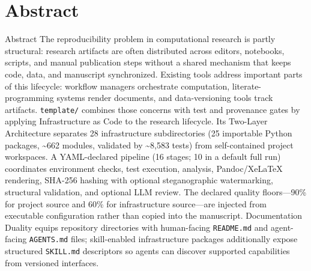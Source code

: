 \documentclass[
  ignorenonframetext,
]{beamer}
\author{\texorpdfstring{}{}}
\date{}
\begin{document}
\section{Abstract}\label{abstract}

\begin{frame}{Abstract}
The reproducibility problem in computational research is partly
structural: research artifacts are often distributed across editors,
notebooks, scripts, and manual publication steps without a shared
mechanism that keeps code, data, and manuscript synchronized. Existing
tools address important parts of this lifecycle: workflow managers
orchestrate computation, literate-programming systems render documents,
and data-versioning tools track artifacts. \texttt{template/} combines
those concerns with test and provenance gates by applying Infrastructure
as Code to the research lifecycle. Its Two-Layer Architecture separates
28 infrastructure subdirectories (25 importable Python packages,
\textasciitilde662 modules, validated by \textasciitilde8,583 tests)
from self-contained project workspaces. A YAML-declared pipeline (16
stages; 10 in a default full run) coordinates environment checks, test
execution, analysis, Pandoc/XeLaTeX rendering, SHA-256 hashing with
optional steganographic watermarking, structural validation, and
optional LLM review. The declared quality floors---90\% for project
source and 60\% for infrastructure source---are injected from executable
configuration rather than copied into the manuscript. Documentation
Duality equips repository directories with human-facing
\texttt{README.md} and agent-facing \texttt{AGENTS.md} files;
skill-enabled infrastructure packages additionally expose structured
\texttt{SKILL.md} descriptors so agents can discover supported
capabilities from versioned interfaces.


\end{frame}
\end{document}
